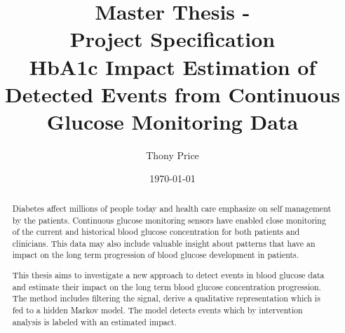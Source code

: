 \documentclass{kththesis}
\title{%
    Master Thesis - \\
    Project Specification \\
    \vspace{.5em}
    \large HbA1c Impact Estimation of Detected Events from Continuous Glucose Monitoring Data\\
}
\author{Thony Price}
\date{\today}
\begin{document}
\frontmatter
\titlepage

\begin{abstract}
  Diabetes affect millions of people today and health care emphasize on self management by the patients.
  Continuous glucose monitoring sensors have enabled close monitoring of the current and historical blood glucose concentration for both patients and clinicians.
  This data may also include valuable insight about patterns that have an impact on the long term progression of blood glucose development in patients.

  This thesis aims to investigate a new approach to detect events in blood glucose data and estimate their impact on the long term blood glucose concentration progression.
  The method includes filtering the signal, derive a qualitative representation which is fed to a hidden Markov model.
  The model detects events which by intervention analysis is labeled with an estimated impact.
\end{abstract}

\tableofcontents
\mainmatter





\printbibliography[heading=bibintoc]
\end{document}

